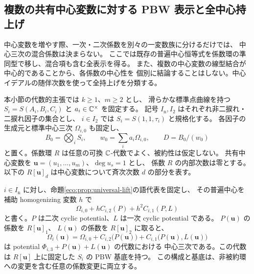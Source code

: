\subsection{複数の共有中心変数に対する PBW 表示と全中心持上げ}
\label{mcp:subsec:pbw}

中心変数を増やす際、一次・二次係数を別々の一変数族に分けるだけでは、
中心三次の混合係数は決まらない。
ここでは既存の普遍中心恒等式を係数環の準同型で移し、混合項も含む全表示を得る。
また、複数の中心変数の線型結合が中心的であることから、各係数の中心性を
個別に結論することはしない。中心イデアルの随伴次数を使って全持上げを分類する。

本小節の代数的主張では $k\ge1$、$m\ge2$ とし、
滑らかな標準点曲線を持つ $S_i=S(A_i,B_i,C_i)$ と
$a_i\in\mathbb C^\times$ を固定する。
記号 $I_{\mathrm n},I_2$ はそれぞれ非二捩れ・二捩れ因子の集合とし、
$i\in I_2$ では $S_i=S(1,1,\tau_i)$ と規格化する。
各因子の生成元と標準中心三次 $\Omega_{i,0}$ も固定し、
\[
 B_0=\bigotimes_iS_i,\qquad
 w_0=\sum_i a_i\Omega_{i,0},\qquad D=B_0/(w_0)
\]
と置く。係数環 $R$ は任意の可換 $\mathbb C$-代数でよく、被約性は仮定しない。
共有中心変数を $\mathbf u=(u_1,\ldots,u_m)$、$\deg u_s=1$ とし、
係数 $R$ の内部次数は零とする。
以下の $R[\mathbf u]_d$ は中心変数について斉次次数 $d$ の部分を表す。

\begin{lemma}[普遍中心恒等式の多中心への代入]
\label{mcp:lem:polarization}
$i\in I_{\mathrm n}$ に対し、命題\ref{eco:prop:universal-lift}の語代表を固定し、
その普遍中心を補助 homogenizing 変数 $h$ で
\[
 \Omega_{i,0}+hC_{i,2}(P)+h^2C_{i,1}(P,L)
\]
と書く。$P$ は二次 cyclic potential、$L$ は一次 cyclic potential である。
$P(\mathbf u)$ の係数を $R[\mathbf u]_1$、
$L(\mathbf u)$ の係数を $R[\mathbf u]_2$ に取ると、
\begin{equation}\label{mcp:eq:substituted-center}
 \Omega_i(\mathbf u)=\Omega_{i,0}
       +C_{i,2}\bigl(P(\mathbf u)\bigr)
       +C_{i,1}\bigl(P(\mathbf u),L(\mathbf u)\bigr)
\end{equation}
は potential $\Phi_{i,3}+P(\mathbf u)+L(\mathbf u)$ の代数における
中心三次である。この代数は $R[\mathbf u]$ 上に固定した $S_i$ の PBW 基底を持つ。
この構成と基底は、非被約環への変更を含む任意の係数変更に両立する。
\end{lemma}

